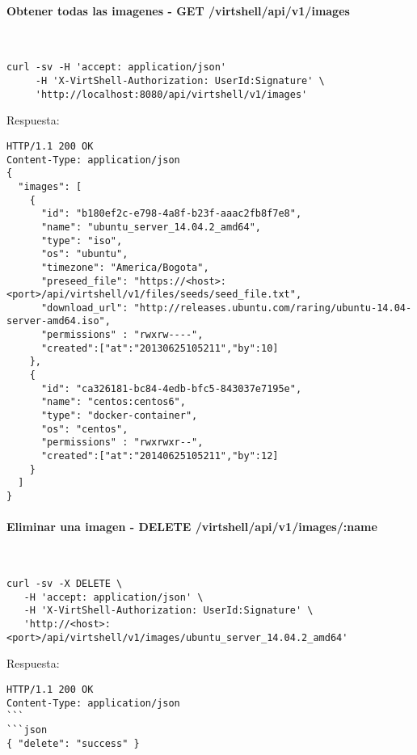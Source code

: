 \paragraph{Obtener todas las imagenes - GET /virtshell/api/v1/images} ~\\

\begin{lstlisting}[style=json]
curl -sv -H 'accept: application/json' 
     -H 'X-VirtShell-Authorization: UserId:Signature' \ 
     'http://localhost:8080/api/virtshell/v1/images'
\end{lstlisting}

\vspace{1cm}
Respuesta:
\vspace{1cm}

\begin{lstlisting}[style=json]
HTTP/1.1 200 OK
Content-Type: application/json
{
  "images": [
    {
      "id": "b180ef2c-e798-4a8f-b23f-aaac2fb8f7e8",
      "name": "ubuntu_server_14.04.2_amd64",
      "type": "iso",
      "os": "ubuntu",  
      "timezone": "America/Bogota", 
      "preseed_file": "https://<host>:<port>/api/virtshell/v1/files/seeds/seed_file.txt",
      "download_url": "http://releases.ubuntu.com/raring/ubuntu-14.04-server-amd64.iso",
      "permissions" : "rwxrw----",
      "created":["at":"20130625105211","by":10]
    },
    {
      "id": "ca326181-bc84-4edb-bfc5-843037e7195e",
      "name": "centos:centos6",
      "type": "docker-container",
      "os": "centos", 
      "permissions" : "rwxrwxr--",
      "created":["at":"20140625105211","by":12]
    }
  ]
}  
\end{lstlisting}

\paragraph{Eliminar una imagen - DELETE /virtshell/api/v1/images/:name} ~\\

\begin{lstlisting}[style=json]
curl -sv -X DELETE \
   -H 'accept: application/json' \
   -H 'X-VirtShell-Authorization: UserId:Signature' \
   'http://<host>:<port>/api/virtshell/v1/images/ubuntu_server_14.04.2_amd64'
\end{lstlisting}

\vspace{1cm}
Respuesta:
\vspace{1cm}

\begin{lstlisting}[style=json]
HTTP/1.1 200 OK
Content-Type: application/json
```
```json
{ "delete": "success" }
\end{lstlisting}
